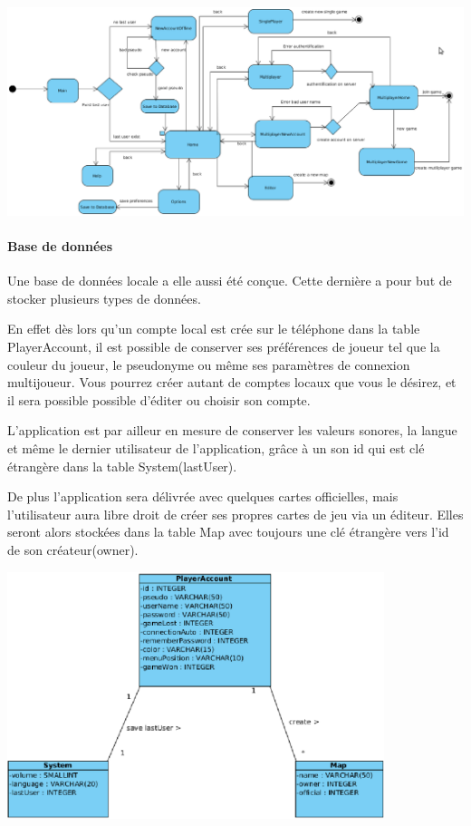 	\begin{center}
		\label{activité}
		\includegraphics[width=23cm, angle=90]{Analyse/Img/diag_activity.eps}
	\end{center}

	\paragraph{Base de données\\}
			
		Une base de données locale a elle aussi été conçue. Cette dernière a pour
		but de stocker plusieurs types de données.
				
		En effet dès lors qu'un compte local est crée sur le téléphone dans la
		table PlayerAccount, il est possible de conserver ses préférences de joueur
		tel que la couleur du joueur, le pseudonyme ou même ses paramètres de connexion multijoueur. 
		Vous pourrez créer autant de comptes locaux que vous le désirez, et il
		sera possible possible d'éditer ou choisir son compte.
				
		L'application est par ailleur en mesure de conserver
		les valeurs sonores, la langue et même le dernier utilisateur de
		l'application, grâce à un son id qui est clé étrangère dans la table System(lastUser).
				
		De plus l'application sera délivrée avec quelques cartes officielles, mais
		l'utilisateur aura libre droit de créer ses propres cartes de jeu via un
		éditeur. Elles seront alors stockées dans la table Map avec toujours une
		clé étrangère vers l'id de son créateur(owner). \\
				
		\begin{center}
			\includegraphics[width=11cm]{Analyse/Img/menu_bdd.eps}
		\end{center}
						
